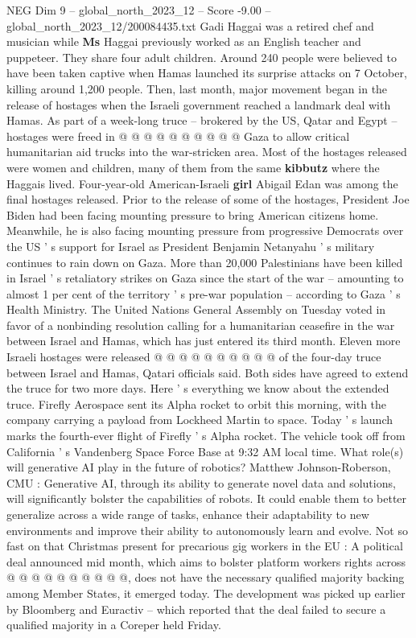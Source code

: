 \begin{textsample}{NEG Dim 9 – global\_north\_2023\_12 – Score -9.00 – global\_north\_2023\_12/200084435.txt}
Gadi Haggai was a retired chef and musician while \textbf{Ms} Haggai previously worked as an English teacher and puppeteer.
They share four adult children.
Around 240 people were believed to have been taken captive when Hamas launched its surprise attacks on 7 October, killing around 1,200 people.
Then, last month, major movement began in the release of hostages when the Israeli government reached a landmark deal with Hamas.
As part of a week-long truce -- brokered by the US, Qatar and Egypt -- hostages were freed in @ @ @ @ @ @ @ @ @ @ Gaza to allow critical humanitarian aid trucks into the war-stricken area.
Most of the hostages released were women and children, many of them from the same \textbf{kibbutz} where the Haggais lived.
Four-year-old American-Israeli \textbf{girl} Abigail Edan was among the final hostages released.
Prior to the release of some of the hostages, President Joe Biden had been facing mounting pressure to bring American citizens home.
Meanwhile, he is also facing mounting pressure from progressive Democrats over the US ' s support for Israel as President Benjamin Netanyahu ' s military continues to rain down on Gaza.
More than 20,000 Palestinians have been killed in Israel ' s retaliatory strikes on Gaza since the start of the war -- amounting to almost 1 per cent of the territory ' s pre-war population -- according to Gaza ' s Health Ministry.
The United Nations General Assembly on Tuesday voted in favor of a nonbinding resolution calling for a humanitarian ceasefire in the war between Israel and Hamas, which has just entered its third month.
Eleven more Israeli hostages were released @ @ @ @ @ @ @ @ @ @ of the four-day truce between Israel and Hamas, Qatari officials said.
Both sides have agreed to extend the truce for two more days.
Here ' s everything we know about the extended truce.
Firefly Aerospace sent its Alpha rocket to orbit this morning, with the company carrying a payload from Lockheed Martin to space.
Today ' s launch marks the fourth-ever flight of Firefly ' s Alpha rocket.
The vehicle took off from California ' s Vandenberg Space Force Base at 9:32 AM local time.
What role(s) will generative AI play in the future of robotics?
Matthew Johnson-Roberson, CMU : Generative AI, through its ability to generate novel data and solutions, will significantly bolster the capabilities of robots.
It could enable them to better generalize across a wide range of tasks, enhance their adaptability to new environments and improve their ability to autonomously learn and evolve.
Not so fast on that Christmas present for precarious gig workers in the EU : A political deal announced mid month, which aims to bolster platform workers rights across @ @ @ @ @ @ @ @ @ @, does not have the necessary qualified majority backing among Member States, it emerged today.
The development was picked up earlier by Bloomberg and Euractiv -- which reported that the deal failed to secure a qualified majority in a Coreper held Friday.

\end{textsample}
